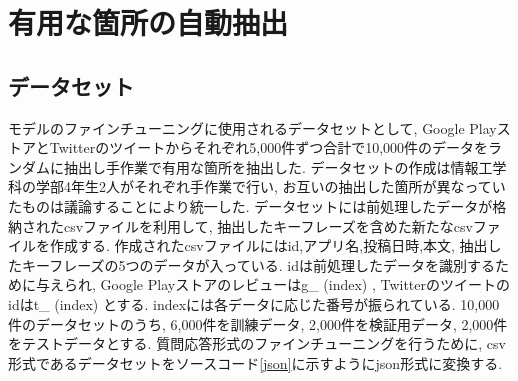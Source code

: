 

\section{有用な箇所の自動抽出}\label{extraction}
\subsection{データセット}\label{dataset}
モデルのファインチューニングに使用されるデータセットとして, Google PlayストアとTwitterのツイートからそれぞれ5,000件ずつ合計で10,000件のデータをランダムに抽出し手作業で有用な箇所を抽出した. データセットの作成は情報工学科の学部4年生2人がそれぞれ手作業で行い, お互いの抽出した箇所が異なっていたものは議論することにより統一した. 
データセットには前処理したデータが格納されたcsvファイルを利用して, 抽出したキーフレーズを含めた新たなcsvファイルを作成する. 作成されたcsvファイルにはid,アプリ名,投稿日時,本文, 抽出したキーフレーズの5つのデータが入っている. idは前処理したデータを識別するために与えられ, Google Playストアのレビューはg\_ (index) , Twitterのツイートのidはt\_ (index) とする.  indexには各データに応じた番号が振られている. 
10,000件のデータセットのうち, 6,000件を訓練データ, 2,000件を検証用データ, 2,000件をテストデータとする. 質問応答形式のファインチューニングを行うために, csv形式であるデータセットをソースコード\ref{json}に示すようにjson形式に変換する. 

